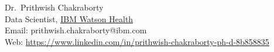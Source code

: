\begin{minipage}[t]{0.75\textwidth}

Dr.\ Prithwish Chakraborty\\
Data Scientist, \href{https://www.ibm.com/watson/health/}{IBM Watson Health}\\
Email: prithwish.chakraborty@ibm.com\\
Web: \href{https://www.linkedin.com/in/prithwish-chakraborty-ph-d-8b858835}{https://www.linkedin.com/in/prithwish-chakraborty-ph-d-8b858835}\\

\end{minipage}
